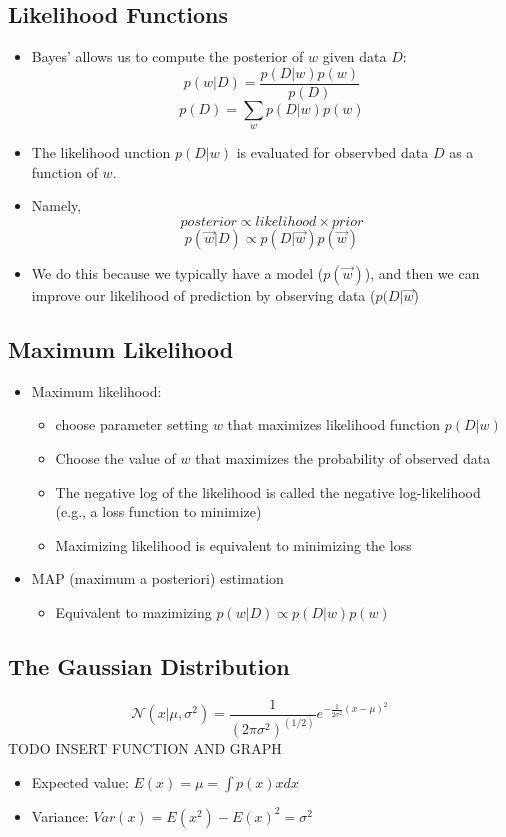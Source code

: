 \subsection{Likelihood Functions}
\begin{itemize}
	\item Bayes' allows us to compute the posterior of $w$ given data $D$:
		$$p(w|D)=\frac{p(D|w)p(w)}{p(D)}$$
		$$p(D)=\sum_w p(D|w)p(w)$$
	\item The likelihood unction $p(D|w)$ is evaluated for observbed data $D$ as a function of $w$.
	\item Namely,
		$$posterior\propto likelihood\times prior$$
		$$p(\vec{w}|D)\propto p(D|\vec{w})p(\vec{w})$$
	\item We do this because we typically have a model ($p(\vec{w})$), and then we can improve our likelihood of prediction by observing data ($p(D|\vec{w}$)
\end{itemize}

\subsection{Maximum Likelihood}
\begin{itemize}
	\item Maximum likelihood:
	\begin{itemize}
		\item choose parameter setting $w$ that maximizes likelihood function $p(D|w)$
		\item Choose the value of $w$ that maximizes the probability of observed data
		\item The negative log of the likelihood is called the negative log-likelihood (e.g., a loss function to minimize)
		\item Maximizing likelihood is equivalent to minimizing the loss
	\end{itemize}
	\item MAP (maximum a posteriori) estimation
	\begin{itemize}
		\item Equivalent to mazimizing $p(w|D)\propto p(D|w)p(w)$
	\end{itemize}
\end{itemize}

\subsection{The Gaussian Distribution}
$$\mathcal{N}(x|\mu, \sigma^2)=\frac{1}{(2\pi\sigma^2)^(1/2)}e^{-\frac{1}{2\sigma^2}(x-\mu)^2}$$
TODO INSERT FUNCTION AND GRAPH
\begin{itemize}
	\item Expected value: $E(x)=\mu=\int p(x)x dx$
	\item Variance: $Var(x)=E(x^2) - E(x)^2=\sigma^2$
\end{itemize}

